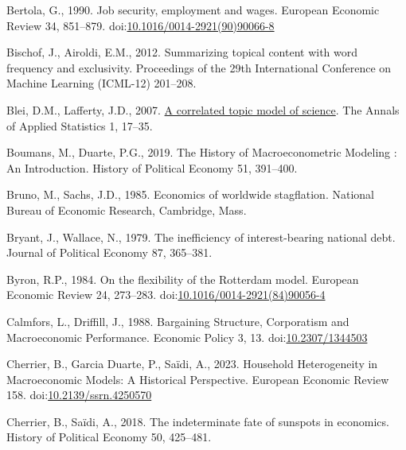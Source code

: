 \documentclass[
  12pt,
  onecolumn]{article}
\newlength{\cslhangindent}
\newlength{\cslentryspacingunit} %
\newenvironment{CSLReferences}[2] %
 {%
  \setlength{\parindent}{0pt}
  \ifodd #1
  \let\oldpar\par
  \def\par{\hangindent=\cslhangindent\oldpar}
  \fi
  \setlength{\parskip}{#2\cslentryspacingunit}
 }%
 {}
\begin{document}
\begin{CSLReferences}{1}{0}
\leavevmode{}%
Bertola, G., 1990. Job security, employment and wages. European Economic Review 34, 851--879. doi:\href{https://doi.org/10.1016/0014-2921(90)90066-8}{10.1016/0014-2921(90)90066-8}

\leavevmode{}%
Bischof, J., Airoldi, E.M., 2012. Summarizing topical content with word frequency and exclusivity. Proceedings of the 29th International Conference on Machine Learning (ICML-12) 201--208.

\leavevmode{}%
Blei, D.M., Lafferty, J.D., 2007. \href{https://www.jstor.org/stable/4537420}{A correlated topic model of science}. The Annals of Applied Statistics 1, 17--35.

\leavevmode{}%
Boumans, M., Duarte, P.G., 2019. The {History} of {Macroeconometric Modeling} : {An Introduction}. History of Political Economy 51, 391--400.

\leavevmode{}%
Bruno, M., Sachs, J.D., 1985. Economics of worldwide stagflation. {National Bureau of Economic Research}, {Cambridge, Mass.}

\leavevmode{}%
Bryant, J., Wallace, N., 1979. The inefficiency of interest-bearing national debt. Journal of Political Economy 87, 365--381.

\leavevmode{}%
Byron, R.P., 1984. On the flexibility of the {Rotterdam} model. European Economic Review 24, 273--283. doi:\href{https://doi.org/10.1016/0014-2921(84)90056-4}{10.1016/0014-2921(84)90056-4}

\leavevmode{}%
Calmfors, L., Driffill, J., 1988. Bargaining {Structure}, {Corporatism} and {Macroeconomic Performance}. Economic Policy 3, 13. doi:\href{https://doi.org/10.2307/1344503}{10.2307/1344503}

\leavevmode{}%
Cherrier, B., Garcia Duarte, P., Saïdi, A., 2023. Household {Heterogeneity} in {Macroeconomic Models}: {A Historical Perspective}. European Economic Review 158. doi:\href{https://doi.org/10.2139/ssrn.4250570}{10.2139/ssrn.4250570}

\leavevmode{}%
Cherrier, B., Saïdi, A., 2018. The indeterminate fate of sunspots in economics. History of Political Economy 50, 425--481.


\end{CSLReferences}
\end{document}
